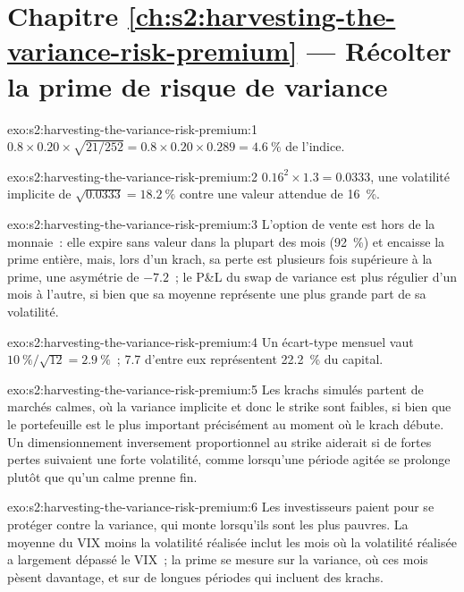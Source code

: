 \section*{Chapitre \ref{ch:s2:harvesting-the-variance-risk-premium} --- Récolter la prime de risque de variance}

\begin{solution}{exo:s2:harvesting-the-variance-risk-premium:1}
$0.8 \times 0.20 \times \sqrt{21/252} = 0.8 \times 0.20 \times 0.289 = 4.6~\%$ de l'indice.
\end{solution}

\begin{solution}{exo:s2:harvesting-the-variance-risk-premium:2}
$0.16^2 \times 1.3 = 0.0333$, une volatilité implicite de $\sqrt{0.0333} = 18.2~\%$ contre une valeur attendue de 16~\%.
\end{solution}

\begin{solution}{exo:s2:harvesting-the-variance-risk-premium:3}
L'option de vente est hors de la monnaie~: elle expire sans valeur dans la plupart des mois (92~\%) et encaisse la prime entière, mais, lors d'un krach, sa perte est plusieurs fois supérieure à la prime, une
asymétrie de $-7.2$~; le P\&L du swap de variance est plus régulier d'un mois à l'autre, si bien que sa moyenne représente une plus grande part de sa volatilité.
\end{solution}

\begin{solution}{exo:s2:harvesting-the-variance-risk-premium:4}
Un écart-type mensuel vaut $10~\%/\sqrt{12} = 2.9~\%$~; 7.7 d'entre eux représentent 22.2~\% du capital.
\end{solution}

\begin{solution}{exo:s2:harvesting-the-variance-risk-premium:5}
Les krachs simulés partent de marchés calmes, où la variance implicite et donc le strike sont faibles, si bien que le portefeuille est le plus important précisément au moment où le krach
débute. Un dimensionnement inversement proportionnel au strike aiderait si de fortes pertes suivaient une forte volatilité, comme lorsqu'une période agitée se prolonge plutôt que
qu'un calme prenne fin.
\end{solution}

\begin{solution}{exo:s2:harvesting-the-variance-risk-premium:6}
Les investisseurs paient pour se protéger contre la variance, qui monte lorsqu'ils sont les plus pauvres. La moyenne du VIX moins la volatilité réalisée inclut les mois où
la volatilité réalisée a largement dépassé le VIX~; la prime se mesure sur la variance, où ces mois pèsent davantage, et sur de longues périodes qui incluent des krachs.
\end{solution}

